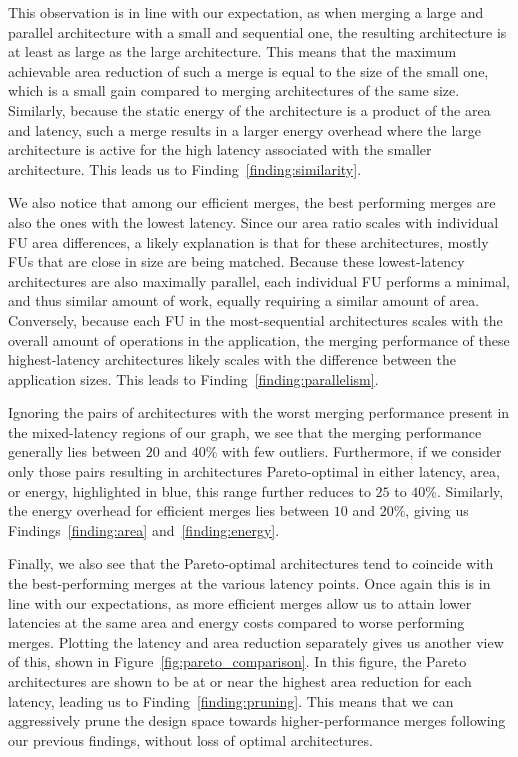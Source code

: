 This observation is in line with our expectation, as when merging a large and parallel architecture with a small and sequential one, the resulting architecture is at least as large as the large architecture. This means that the maximum achievable area reduction of such a merge is equal to the size of the small one, which is a small gain compared to merging architectures of the same size. Similarly, because the static energy of the architecture is a product of the area and latency, such a merge results in a larger energy overhead where the large architecture is active for the high latency associated with the smaller architecture. This leads us to Finding~\ref{finding:similarity}.

We also notice that among our efficient merges, the best performing merges are also the ones with the lowest latency. Since our area ratio scales with individual FU area differences, a likely explanation is that for these architectures, mostly FUs that are close in size are being matched. Because these lowest-latency architectures are also maximally parallel, each individual FU performs a minimal, and thus similar amount of work, equally requiring a similar amount of area. Conversely, because each FU in the most-sequential architectures scales with the overall amount of operations in the application, the merging performance of these highest-latency architectures likely scales with the difference between the application sizes. This leads to Finding~\ref{finding:parallelism}.

Ignoring the pairs of architectures with the worst merging performance present in the mixed-latency regions of our graph, we see that the merging performance generally lies between $20$ and $40\%$ with few outliers. Furthermore, if we consider only those pairs resulting in architectures Pareto-optimal in either latency, area, or energy, highlighted in blue, this range further reduces to $25$ to $40\%$. Similarly, the energy overhead for efficient merges lies between $10$ and $20\%$, giving us Findings~\ref{finding:area} and~\ref{finding:energy}.

Finally, we also see that the Pareto-optimal architectures tend to coincide with the best-performing merges at the various latency points. Once again this is in line with our expectations, as more efficient merges allow us to attain lower latencies at the same area and energy costs compared to worse performing merges. Plotting the latency and area reduction separately gives us another view of this, shown in Figure~\ref{fig:pareto_comparison}. In this figure, the Pareto architectures are shown to be at or near the highest area reduction for each latency, leading us to Finding~\ref{finding:pruning}. This means that we can aggressively prune the design space towards higher-performance merges following our previous findings, without loss of optimal architectures.

